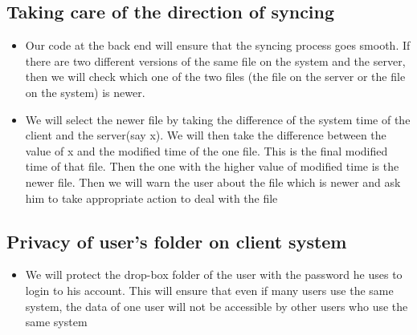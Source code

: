 \documentclass{article}
\begin{document}
		\subsection{Taking care of the direction of syncing}
			\begin{itemize}
				\item Our code at the back end will ensure that the syncing process goes smooth. If there are two different versions of the same file on the system and the server, then we will check which one of the two files (the file on the server or the file on the system) is newer.
				\item We will select the newer file by taking the difference of the system time of the client and the server(say x). We will then take the difference between the value of x and the modified time of the one file. This is the final modified time of that file. Then the one with the higher value of modified time is the newer file. Then we will warn the user about the file which is newer and ask him to take appropriate action to deal with the file
			\end{itemize}
		\subsection{Privacy of user's folder on client system}
			\begin{itemize}
				\item We will protect the drop-box folder of the user with the password he uses to login to his account. This will ensure that even if many users use the same system, the data of one user will not be accessible by other users who use the same system
			\end{itemize}
\end{document}
